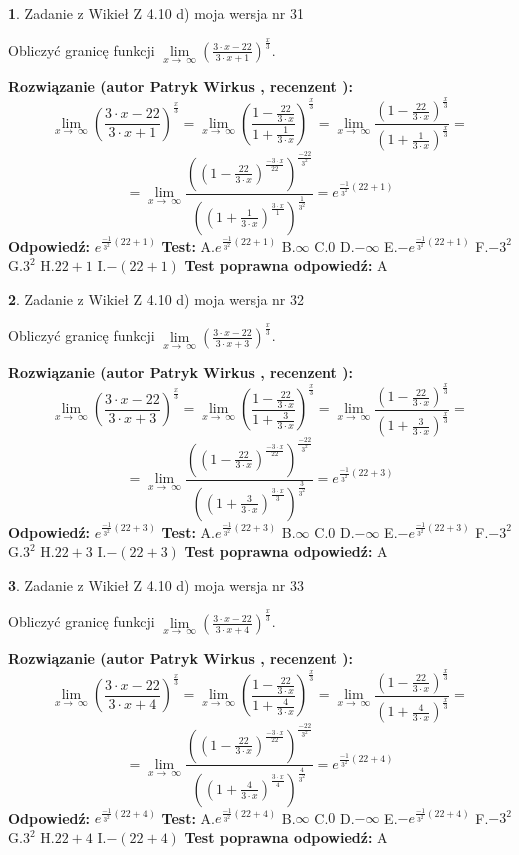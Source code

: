 \documentclass[12pt, a4paper]{article}
\theoremstyle{definition} %
\newtheorem{zad}{}
\newcommand{\zadStart}[1]{\begin{zad}#1\newline}
\newcommand{\zadStop}{\end{zad}}
\newcommand{\rozwStart}[2]{\noindent \textbf{Rozwiązanie (autor #1 , recenzent #2): }\newline}
\newcommand{\rozwStop}{\newline}
\newcommand{\odpStart}{\noindent \textbf{Odpowiedź:}\newline}
\newcommand{\odpStop}{\newline}
\newcommand{\testStart}{\noindent \textbf{Test:}\newline}
\newcommand{\testStop}{\newline}
\newcommand{\kluczStart}{\noindent \textbf{Test poprawna odpowiedź:}\newline}
\newcommand{\kluczStop}{\newline}
\begin{document}
\zadStart{Zadanie z Wikieł Z 4.10 d) moja wersja nr 31}


Obliczyć granicę funkcji  $\lim\limits_{x\to\ \infty}(\frac{3\cdot x-22}{3\cdot x+1})^{\frac{x}{3}}$.
\zadStop
\rozwStart{Patryk Wirkus}{}
$$\lim\limits_{x\to\ \infty}(\frac{3\cdot x-22}{3\cdot x+1})^{\frac{x}{3}} = \lim\limits_{x\to\ \infty}(\frac{1-\frac{22}{3\cdot x}}{1+\frac{1}{3\cdot x}})^{\frac{x}{3}}=\lim\limits_{x\to\ \infty}\frac{(1-\frac{22}{3\cdot x})^{\frac{x}{3}}}{(1+\frac{1}{3\cdot x})^{\frac{x}{3}}}=$$
$$=\lim\limits_{x\to\ \infty}\frac{((1-\frac{22}{3\cdot x})^{\frac{-3\cdot x}{22}})^{\frac{-22}{3^{2}}}}{((1+\frac{1}{3\cdot x})^{\frac{3\cdot x}{1}})^{\frac{1}{3^{2}}}}=e^{\frac{-1}{3^{2}}(22+1)}$$
\rozwStop
\odpStart
$e^{\frac{-1}{3^{2}}(22+1)}$
\odpStop
\testStart
A.$e^{\frac{-1}{3^{2}}(22+1)}$ B.$\infty$ C.$0$ D.$-\infty$ E.$-e^{\frac{-1}{3^{2}}(22+1)}$
F.$-3^{2}$ G.$3^{2}$
H.$22+1$
I.$-(22+1)$
\testStop
\kluczStart
A
\kluczStop



\zadStart{Zadanie z Wikieł Z 4.10 d) moja wersja nr 32}


Obliczyć granicę funkcji  $\lim\limits_{x\to\ \infty}(\frac{3\cdot x-22}{3\cdot x+3})^{\frac{x}{3}}$.
\zadStop
\rozwStart{Patryk Wirkus}{}
$$\lim\limits_{x\to\ \infty}(\frac{3\cdot x-22}{3\cdot x+3})^{\frac{x}{3}} = \lim\limits_{x\to\ \infty}(\frac{1-\frac{22}{3\cdot x}}{1+\frac{3}{3\cdot x}})^{\frac{x}{3}}=\lim\limits_{x\to\ \infty}\frac{(1-\frac{22}{3\cdot x})^{\frac{x}{3}}}{(1+\frac{3}{3\cdot x})^{\frac{x}{3}}}=$$
$$=\lim\limits_{x\to\ \infty}\frac{((1-\frac{22}{3\cdot x})^{\frac{-3\cdot x}{22}})^{\frac{-22}{3^{2}}}}{((1+\frac{3}{3\cdot x})^{\frac{3\cdot x}{3}})^{\frac{3}{3^{2}}}}=e^{\frac{-1}{3^{2}}(22+3)}$$
\rozwStop
\odpStart
$e^{\frac{-1}{3^{2}}(22+3)}$
\odpStop
\testStart
A.$e^{\frac{-1}{3^{2}}(22+3)}$ B.$\infty$ C.$0$ D.$-\infty$ E.$-e^{\frac{-1}{3^{2}}(22+3)}$
F.$-3^{2}$ G.$3^{2}$
H.$22+3$
I.$-(22+3)$
\testStop
\kluczStart
A
\kluczStop



\zadStart{Zadanie z Wikieł Z 4.10 d) moja wersja nr 33}


Obliczyć granicę funkcji  $\lim\limits_{x\to\ \infty}(\frac{3\cdot x-22}{3\cdot x+4})^{\frac{x}{3}}$.
\zadStop
\rozwStart{Patryk Wirkus}{}
$$\lim\limits_{x\to\ \infty}(\frac{3\cdot x-22}{3\cdot x+4})^{\frac{x}{3}} = \lim\limits_{x\to\ \infty}(\frac{1-\frac{22}{3\cdot x}}{1+\frac{4}{3\cdot x}})^{\frac{x}{3}}=\lim\limits_{x\to\ \infty}\frac{(1-\frac{22}{3\cdot x})^{\frac{x}{3}}}{(1+\frac{4}{3\cdot x})^{\frac{x}{3}}}=$$
$$=\lim\limits_{x\to\ \infty}\frac{((1-\frac{22}{3\cdot x})^{\frac{-3\cdot x}{22}})^{\frac{-22}{3^{2}}}}{((1+\frac{4}{3\cdot x})^{\frac{3\cdot x}{4}})^{\frac{4}{3^{2}}}}=e^{\frac{-1}{3^{2}}(22+4)}$$
\rozwStop
\odpStart
$e^{\frac{-1}{3^{2}}(22+4)}$
\odpStop
\testStart
A.$e^{\frac{-1}{3^{2}}(22+4)}$ B.$\infty$ C.$0$ D.$-\infty$ E.$-e^{\frac{-1}{3^{2}}(22+4)}$
F.$-3^{2}$ G.$3^{2}$
H.$22+4$
I.$-(22+4)$
\testStop
\kluczStart
A
\kluczStop
\end{document}
